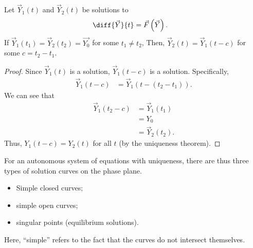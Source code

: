 \documentclass[10pt]{mypackage}
\begin{document}
\begin{example}
\begin{theorem}
    Let $\vec{Y}_1(t)$ and $\vec{Y}_2(t)$ be solutions to
    \begin{align*}
      \diff{\vec{Y}}{t} &= \vec{F}\left(\vec{Y}\right).
    \end{align*}
    If $\vec{Y}_1\left(t_1\right) = \vec{Y}_2\left(t_2\right) = \vec{Y_0}$ for some $t_1\neq t_2$, Then, $\vec{Y}_2\left(t\right) = \vec{Y}_1\left(t-c\right)$ for some $c = t_2 - t_1$.
  \end{theorem}
  \begin{proof}
    Since $\vec{Y}_1(t)$ is a solution, $\vec{Y}_1(t-c)$ is a solution. Specifically,
    \begin{align*}
      \vec{Y}_1\left(t-c\right) &= \vec{Y}_1\left(t-\left(t_2 - t_1\right)\right).
    \end{align*}
    We can see that
    \begin{align*}
      \vec{Y}_1\left(t_2 - c\right) &= \vec{Y}_1\left(t_1\right)\\
                                    &= Y_0\\
                                    &= \vec{Y}_2\left(t_2\right).
    \end{align*}
    Thus, $Y_1\left(t-c\right) = Y_2\left(t\right)$ for all $t$ (by the uniqueness theorem).
  \end{proof}
  For an autonomous system of equations with uniqueness, there are thus three types of solution curves on the phase plane.
  \begin{itemize}
    \item Simple closed curves;
    \item simple open curves;
    \item singular points (equilibrium solutions).
  \end{itemize}
  Here, ``simple'' refers to the fact that the curves do not intersect themselves.
\end{example}
\end{document}

